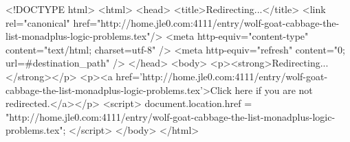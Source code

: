 <!DOCTYPE html>
<html>
<head>
<title>Redirecting...</title>
<link rel="canonical" href="http://home.jle0.com:4111/entry/wolf-goat-cabbage-the-list-monadplus-logic-problems.tex"/>
<meta http-equiv="content-type" content="text/html; charset=utf-8" />
<meta http-equiv="refresh" content="0; url=#{destination_path}" />
</head>
<body>
  <p><strong>Redirecting...</strong></p>
  <p><a href='http://home.jle0.com:4111/entry/wolf-goat-cabbage-the-list-monadplus-logic-problems.tex'>Click here if you are not redirected.</a></p>
  <script>
    document.location.href = "http://home.jle0.com:4111/entry/wolf-goat-cabbage-the-list-monadplus-logic-problems.tex";
  </script>
</body>
</html>

